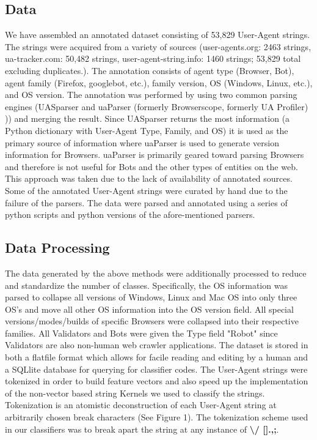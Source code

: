 \documentclass[10pt]{article}
\begin{document}
\subsection{Data}
We have assembled an annotated dataset consisting of 53,829 User-Agent strings.  The strings were acquired from a variety of sources (user-agents.org: 2463 strings, ua-tracker.com: 50,482 strings, user-agent-string.info: 1460 strings; 53,829 total excluding duplicates.).\cite{ua.org,uatracker,uas.info}  The annotation consists of agent type (Browser, Bot), agent family (Firefox, googlebot, etc.), family version, OS (Windows, Linux, etc.), and OS version.  The annotation was performed by using two common parsing engines (UASparser\cite{uas.info} and uaParser (formerly Browserscope, formerly UA Profiler)\cite{uaParser} )) and merging the result.  Since UASparser returns the most information (a Python dictionary with User-Agent Type, Family, and OS) it is used as the primary source of information where uaParser is used to generate version information for Browsers.  uaParser is primarily geared toward parsing Browsers and therefore is not useful for Bots and the other types of entities on the web.   This approach was taken due to the lack of availability of annotated sources.  Some of the annotated User-Agent strings were curated by hand due to the failure of the parsers.  The data were parsed and annotated using a series of python scripts and python versions of the afore-mentioned parsers.  
\subsection{Data Processing}
The data generated by the above methods were additionally processed to reduce and standardize the number of classes.  Specifically, the OS information was parsed to collapse all versions of Windows, Linux and Mac OS into only three OS's and move all other OS information into the OS version field.  All special versions/modes/builds of specific Browsers were collapsed into their respective families.  All Validators and Bots were given the Type field "Robot" since Validators are also non-human web crawler applications.  The dataset is stored in both a flatfile format which allows for facile reading and editing by a human and a SQLlite database for querying for classifier codes.  
The User-Agent strings were tokenized in order to build feature vectors and also speed up the implementation of the non-vector based string Kernels we used to classify the strings.  Tokenization is an atomistic deconstruction of each User-Agent string at arbitrarily chosen break characters (See Figure 1).  The tokenization scheme used in our classifiers was to break apart the string at any instance of {\bf \textbackslash / [].,;}.    
\end{document}
